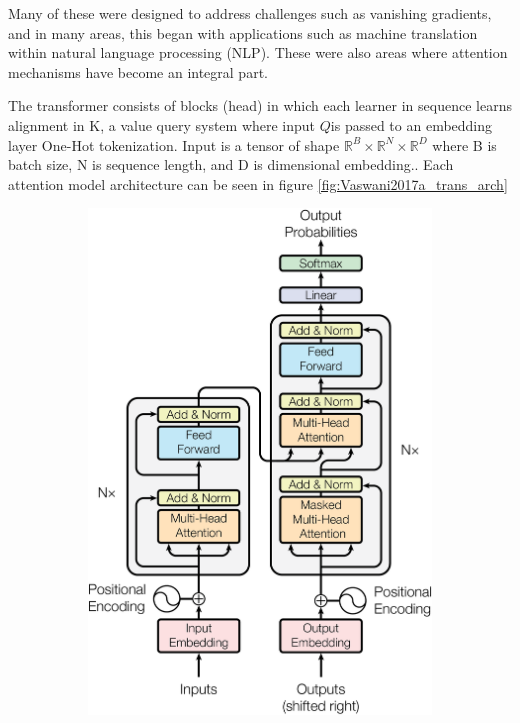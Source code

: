 Many of these were designed to address challenges such as vanishing gradients, and in many areas, this began with applications such as machine translation within natural language processing (NLP)\cite{Wolf2020a}. These were also areas where attention mechanisms have become an integral part\cite{Vaswani2017a}. 

The transformer consists of blocks (head) in which each learner in sequence learns alignment in K, a value query system where input $Q$is passed to an embedding layer One-Hot tokenization. Input is a tensor of shape $\mathbb{R}^B \times \mathbb{R}^N \times \mathbb{R}^D$ where B is batch size, N is sequence length, and D is dimensional embedding.\cite{Tay2020}. Each attention model architecture can be seen in figure \ref{fig:Vaswani2017a_trans_arch}
\begin{figure}
    \centering
    \begin{subfigure}[b]{0.3\textwidth}
        \includegraphics[width=\textwidth]{figures/research_methadology/tranformer_architecture.png}

\end{subfigure}
\end{figure}
